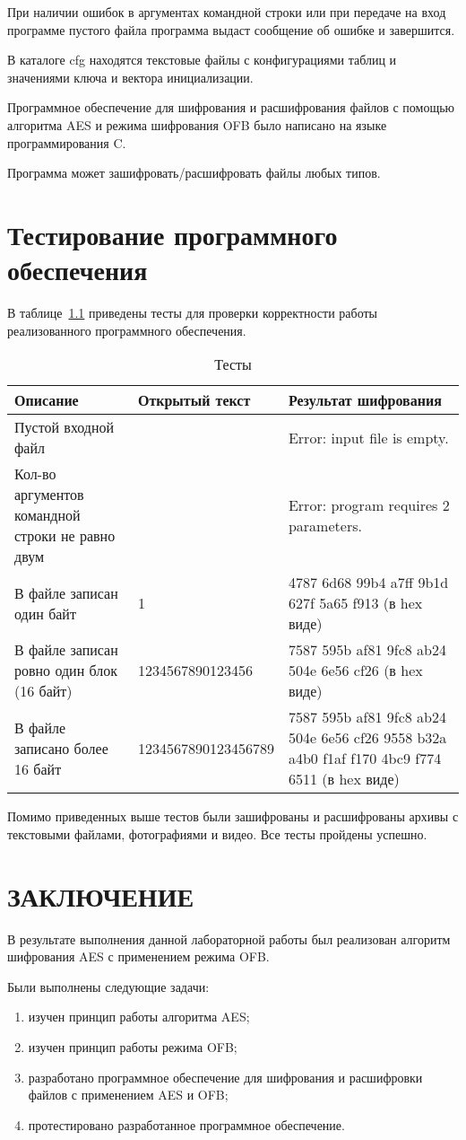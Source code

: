 \documentclass{bmstu}
\begin{document}
При наличии ошибок в аргументах командной строки или при передаче на вход программе пустого файла программа выдаст сообщение об ошибке и завершится.

В каталоге cfg находятся текстовые файлы с конфигурациями таблиц и значениями ключа и вектора инициализации.

Программное обеспечение для шифрования и расшифрования файлов с помощью алгоритма AES и режима шифрования OFB было написано на языке программирования C.

Программа может зашифровать/расшифровать файлы любых типов.

\chapter{Тестирование программного обеспечения}

В таблице~\ref{tabular:tests} приведены тесты для проверки корректности работы реализованного программного обеспечения.

\begin{table}[H]
\caption{Тесты}
\label{tabular:tests}
\begin{tabular}{|p{4cm}|p{5cm}|p{6cm}|}
\hline
\textbf{Описание} & \textbf{Открытый текст} & \textbf{Результат шифрования}
\tabularnewline
\hline
Пустой входной файл & & Error: input file is empty.
\tabularnewline
\hline
Кол-во аргументов командной строки не равно двум & & Error: program requires 2 parameters.
\tabularnewline
\hline
В файле записан один байт & 1 & 4787 6d68 99b4 a7ff 9b1d 627f 5a65 f913 (в hex виде)
\tabularnewline
\hline
В файле записан ровно один блок (16 байт) & 1234567890123456 & 7587 595b af81 9fc8 ab24 504e 6e56 cf26 (в hex виде)
\tabularnewline
\hline
В файле записано более 16 байт & 1234567890123456789 & 7587 595b af81 9fc8 ab24 504e 6e56 cf26 9558 b32a a4b0 f1af f170 4bc9 f774 6511 (в hex виде)
\tabularnewline
\hline
\end{tabular}
\end{table}

Помимо приведенных выше тестов были зашифрованы и расшифрованы архивы с текстовыми файлами, фотографиями и видео. 
Все тесты пройдены успешно.

{\centering \chapter*{ЗАКЛЮЧЕНИЕ}}

В результате выполнения данной лабораторной работы был реализован алгоритм шифрования AES с применением режима OFB.

Были выполнены следующие задачи:
\begin{enumerate}
\item[1)] изучен принцип работы алгоритма AES;
\item[2)] изучен принцип работы режима OFB;
\item[2)] разработано программное обеспечение для шифрования и расшифровки файлов с применением AES и OFB;
\item[4)] протестировано разработанное программное обеспечение.
\end{enumerate}

{\centering \printbibliography[title=СПИСОК ИСПОЛЬЗОВАННЫХ ИСТОЧНИКОВ,heading=bibintoc]}
\end{document}

